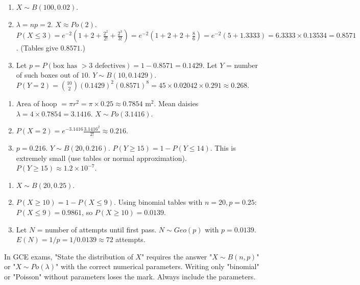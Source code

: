 \documentclass[11pt]{article}
\begin{document}
\begin{corrige}[Exercise 1]
\begin{enumerate}
    \item[a)] $X \sim B(100, 0.02)$.
    \item[b)] $\lambda = np = 2$. $X \approx Po(2)$.
    $P(X \le 3) = e^{-2}\left(1 + 2 + \frac{2^2}{2!} + \frac{2^3}{3!}\right) = e^{-2}\left(1 + 2 + 2 + \frac{8}{6}\right) = e^{-2}\left(5 + 1.3333\right) = 6.3333 \times 0.13534 = 0.8571$.
    (Tables give $0.8571$.)
    \item[c)] Let $p = P(\text{box has } >3 \text{ defectives}) = 1 - 0.8571 = 0.1429$.
    Let $Y$ = number of such boxes out of $10$. $Y \sim B(10, 0.1429)$.
    $P(Y=2) = \binom{10}{2}(0.1429)^2(0.8571)^8 = 45 \times 0.02042 \times 0.291 \approx 0.268$.
\end{enumerate}
\end{corrige}

\begin{corrige}[Exercise 2]
\begin{enumerate}
    \item[a)] Area of hoop $= \pi r^2 = \pi \times 0.25 \approx 0.7854$ m$^2$.
    Mean daisies $\lambda = 4 \times 0.7854 = 3.1416$.
    $X \sim Po(3.1416)$.
    \item[b)] $P(X=2) = e^{-3.1416} \frac{3.1416^2}{2!} \approx 0.216$.
    \item[c)] $p = 0.216$. $Y \sim B(20, 0.216)$.
    $P(Y \ge 15) = 1 - P(Y \le 14)$. This is extremely small (use tables or normal approximation). $P(Y \ge 15) \approx 1.2 \times 10^{-7}$.
\end{enumerate}
\end{corrige}

\begin{corrige}[Exercise 3]
\begin{enumerate}
    \item[a)] $X \sim B(20, 0.25)$.
    \item[b)] $P(X \ge 10) = 1 - P(X \le 9)$. Using binomial tables with $n=20, p=0.25$: $P(X \le 9) = 0.9861$, so $P(X \ge 10) = 0.0139$.
    \item[c)] Let $N$ = number of attempts until first pass. $N \sim Geo(p)$ with $p = 0.0139$.
    $E(N) = 1/p = 1/0.0139 \approx 72$ attempts.
\end{enumerate}
\end{corrige}

\begin{attention}
In GCE exams, "State the distribution of $X$" requires the answer "$X \sim B(n,p)$" or "$X \sim Po(\lambda)$" with the correct numerical parameters. Writing only "binomial" or "Poisson" without parameters loses the mark. Always include the parameters.
\end{attention}
\end{document}

